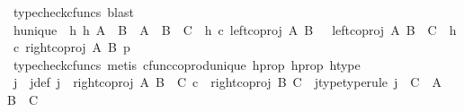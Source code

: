 \begin{isabellebody}
\ {\isacharparenleft}{\kern0pt}typecheck{\isacharunderscore}{\kern0pt}cfuncs{\isacharcomma}{\kern0pt}\ blast{\isacharparenright}{\kern0pt}\isanewline
\ \ \isamarkupfalse%
\ h{\isacharunderscore}{\kern0pt}unique{\isacharcolon}{\kern0pt}\ {\isachardoublequoteopen}{\isasymexists}{\isacharbang}{\kern0pt}\ h{\isachardot}{\kern0pt}\ {\isacharparenleft}{\kern0pt}{\isacharparenleft}{\kern0pt}h{\isacharcolon}{\kern0pt}\ {\isacharparenleft}{\kern0pt}A\ {\isasymCoprod}\ B{\isacharparenright}{\kern0pt}\ {\isasymrightarrow}\ A\ {\isasymCoprod}\ {\isacharparenleft}{\kern0pt}B\ {\isasymCoprod}\ C{\isacharparenright}{\kern0pt}{\isacharparenright}{\kern0pt}\ {\isasymand}\ {\isacharparenleft}{\kern0pt}h\ {\isasymcirc}\isactrlsub c\ {\isacharparenleft}{\kern0pt}left{\isacharunderscore}{\kern0pt}coproj\ A\ B{\isacharparenright}{\kern0pt}\ \ {\isacharequal}{\kern0pt}\ {\isacharparenleft}{\kern0pt}left{\isacharunderscore}{\kern0pt}coproj\ A\ {\isacharparenleft}{\kern0pt}B\ {\isasymCoprod}\ C{\isacharparenright}{\kern0pt}{\isacharparenright}{\kern0pt}{\isacharparenright}{\kern0pt}\ {\isasymand}\ {\isacharparenleft}{\kern0pt}h\ {\isasymcirc}\isactrlsub c\ {\isacharparenleft}{\kern0pt}right{\isacharunderscore}{\kern0pt}coproj\ A\ B{\isacharparenright}{\kern0pt}\ {\isacharequal}{\kern0pt}p{\isacharparenright}{\kern0pt}{\isacharparenright}{\kern0pt}{\isachardoublequoteclose}\isanewline
\ \ \ \ \isamarkupfalse%
\ {\isacharparenleft}{\kern0pt}typecheck{\isacharunderscore}{\kern0pt}cfuncs{\isacharcomma}{\kern0pt}\ metis\ cfunc{\isacharunderscore}{\kern0pt}coprod{\isacharunderscore}{\kern0pt}unique\ h{\isacharunderscore}{\kern0pt}prop{}\ h{\isacharunderscore}{\kern0pt}prop{}\ h{\isacharunderscore}{\kern0pt}type{\isacharparenright}{\kern0pt}\isanewline
\isanewline
\ \ \isamarkupfalse%
\ j\ \ j{\isacharunderscore}{\kern0pt}def{\isacharcolon}{\kern0pt}\ {\isachardoublequoteopen}j\ {\isacharequal}{\kern0pt}\ {\isacharparenleft}{\kern0pt}right{\isacharunderscore}{\kern0pt}coproj\ A\ {\isacharparenleft}{\kern0pt}B\ {\isasymCoprod}\ C{\isacharparenright}{\kern0pt}{\isacharparenright}{\kern0pt}\ {\isasymcirc}\isactrlsub c\ \ {\isacharparenleft}{\kern0pt}right{\isacharunderscore}{\kern0pt}coproj\ B\ C{\isacharparenright}{\kern0pt}{\isachardoublequoteclose}\ \ j{\isacharunderscore}{\kern0pt}type{\isacharbrackleft}{\kern0pt}type{\isacharunderscore}{\kern0pt}rule{\isacharbrackright}{\kern0pt}{\isacharcolon}{\kern0pt}\ {\isachardoublequoteopen}j\ {\isacharcolon}{\kern0pt}\ C\ {\isasymrightarrow}\ A\ {\isasymCoprod}\ {\isacharparenleft}{\kern0pt}B\ {\isasymCoprod}\ C{\isacharparenright}{\kern0pt}{\isachardoublequoteclose}\isanewline

\end{isabellebody}
